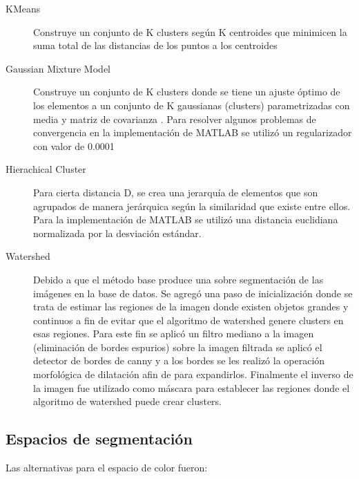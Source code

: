 \documentclass[10pt,twocolumn,letterpaper]{article}
\begin{document}
\begin{description}
\item[KMeans] Construye un conjunto de K clusters según K centroides que minimicen la suma total de las distancias de los puntos a los centroides \cite{Jain2010}

\item[Gaussian Mixture Model] Construye un conjunto de K clusters donde se tiene un ajuste óptimo de los elementos a un conjunto de K gaussianas (clusters) parametrizadas con media  y matriz de covarianza . Para resolver algunos problemas de convergencia en la implementación de MATLAB se utilizó un regularizador con valor de 0.0001

\item[Hierachical Cluster] Para cierta distancia D, se crea una jerarquía de elementos que son agrupados de manera jerárquica según la similaridad que existe entre ellos. Para la implementación de MATLAB se utilizó una distancia euclidiana normalizada por la desviación estándar.

\item[Watershed] Debido a que el método base produce una sobre segmentación  de las imágenes en la base de datos. Se agregó una paso de inicialización donde se trata de estimar las regiones de la imagen donde existen objetos grandes y continuos a fin de evitar que el algoritmo de watershed genere clusters en esas regiones. Para este fin  se aplicó un filtro mediano a la imagen (eliminación de bordes espurios) sobre la imagen filtrada se aplicó el detector de bordes de canny y a los bordes se les realizó la operación morfológica de dilatación afin de para expandirlos.  Finalmente el inverso de la imagen fue utilizado como máscara para establecer las regiones donde el algoritmo de  watershed puede crear clusters.

\end{description}


\subsection{Espacios de segmentación}
Las alternativas para el espacio de color fueron:
\end{document}
